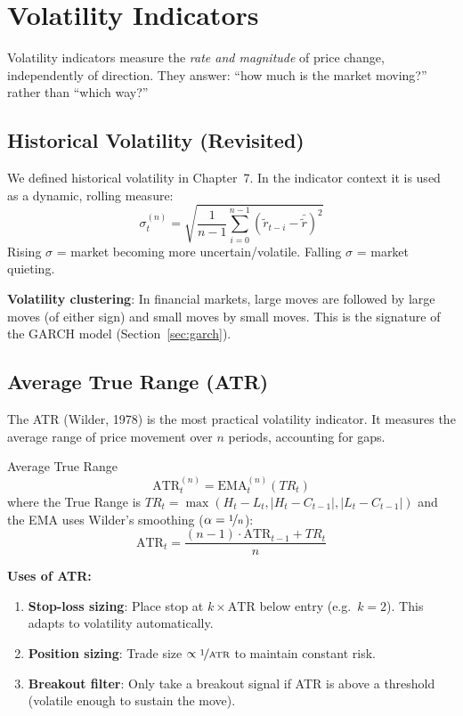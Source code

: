 \documentclass[12pt,a4paper,openany]{report}
\theoremstyle{definition}
\begin{document}

\chapter{Volatility Indicators}

Volatility indicators measure the \emph{rate and magnitude} of price change, independently of direction. They answer: ``how much is the market moving?'' rather than ``which way?''

\section{Historical Volatility (Revisited)}

We defined historical volatility in Chapter~7. In the indicator context it is used as a dynamic, rolling measure:
\[
  \sigma_t^{(n)} = \sqrt{\frac{1}{n-1}\sum_{i=0}^{n-1}(\tilde{r}_{t-i} - \bar{\tilde{r}})^2}
\]
Rising $\sigma$ = market becoming more uncertain/volatile. Falling $\sigma$ = market quieting.

\textbf{Volatility clustering}: In financial markets, large moves are followed by large moves (of either sign) and small moves by small moves. This is the signature of the GARCH model (Section~\ref{sec:garch}).

\section{Average True Range (ATR)}

The ATR (Wilder, 1978) is the most practical volatility indicator. It measures the average range of price movement over $n$ periods, accounting for gaps.

\begin{definitionbox}{Average True Range}
\[
  \text{ATR}_t^{(n)} = \text{EMA}^{(n)}_t(TR_t)
\]
where the True Range is $TR_t = \max(H_t - L_t, |H_t - C_{t-1}|, |L_t - C_{t-1}|)$ and the EMA uses Wilder's smoothing ($\alpha = \nicefrac{1}{n}$):
\[
  \text{ATR}_t = \frac{(n-1)\cdot\text{ATR}_{t-1} + TR_t}{n}
\]
\end{definitionbox}

\textbf{Uses of ATR:}
\begin{enumerate}[label=\arabic*.]
  \item \textbf{Stop-loss sizing}: Place stop at $k \times \text{ATR}$ below entry (e.g.\ $k = 2$). This adapts to volatility automatically.
  \item \textbf{Position sizing}: Trade size $\propto \nicefrac{1}{\text{ATR}}$ to maintain constant risk.
  \item \textbf{Breakout filter}: Only take a breakout signal if ATR is above a threshold (volatile enough to sustain the move).
\end{enumerate}
\end{document}
